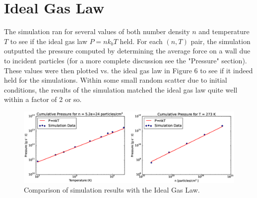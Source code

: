 \documentclass[12pt]{amsart}
\begin{document}

\section{Ideal Gas Law}

The simulation ran for several values of both number density $n$ and temperature $T$ to see if the ideal gas law $P=nk_bT$ held.  For each $(n,T)$ pair, the simulation outputted the pressure computed by determining the average force on a wall due to incident particles (for a more complete discussion see the "Pressure" section).  These values were then plotted vs. the ideal gas law in Figure 6 to see if it indeed held for the simulations.  Within some small random scatter due to initial conditions, the results of the simulation matched the ideal gas law quite well within a factor of 2 or so.

\begin{figure}[h!]
  \centering
    \includegraphics[width=1.0\textwidth]{pv_nrt.eps}
    \caption{Comparison of simulation results with the Ideal Gas Law.}
\end{figure}
\end{document}
